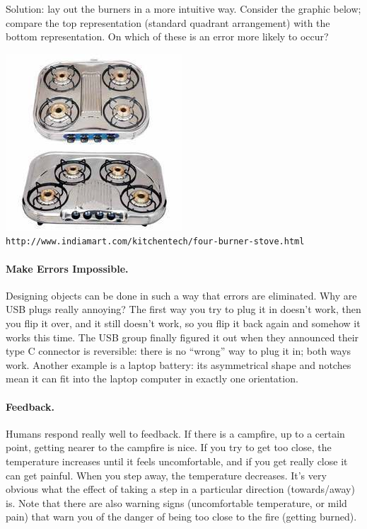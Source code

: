 Solution: lay out the burners in a more intuitive way. Consider the graphic below; compare the top representation (standard quadrant arrangement) with the bottom representation. On which of these is an error more likely to occur?
\vspace{-0.5em}
\begin{center}
	\includegraphics{images/4-burner.jpg}\\ \texttt{http://www.indiamart.com/kitchentech/four-burner-stove.html}
\end{center}

\paragraph{Make Errors Impossible.}
Designing objects can be done in such a way that errors are eliminated. Why are USB plugs really annoying? The first way you try to plug it in doesn't work, then you flip it over, and it still doesn't work, so you flip it back again and somehow it works this time. The USB group finally figured it out when they announced their type C connector is reversible: there is no ``wrong'' way to plug it in; both ways work. Another example is a laptop battery: its asymmetrical shape and notches mean it can fit into the laptop computer in exactly one orientation.

\paragraph{Feedback.}
Humans respond really well to feedback. If there is a campfire, up to a certain point, getting nearer to the campfire is nice. If you try to get too close, the temperature increases until it feels uncomfortable, and if you get really close it can get painful. When you step away, the temperature decreases. It's very obvious what the effect of taking a step in a particular direction (towards/away) is. Note that there are also warning signs (uncomfortable temperature, or mild pain) that warn you of the danger of being too close to the fire (getting burned).

